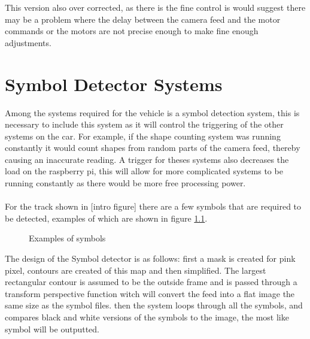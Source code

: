 This version also over corrected, as there is the fine control is would suggest there may be a problem where the delay between the camera feed and the motor commands or the motors are not precise enough to make fine enough adjustments. 

		\chapter{Symbol Detector Systems}
Among the systems required for the vehicle is a symbol detection system, this is necessary to include this system as it will control the triggering of the other systems on the car. For example, if the shape counting system was running constantly it would count shapes from random parts of the camera feed, thereby causing an inaccurate reading. A trigger for theses systems also decreases the load on the raspberry pi, this will allow for more complicated systems to be running constantly as there would be more free processing power.\\ \\
For the track shown in [intro figure] there are a few symbols that are required to be detected, examples of which are shown in figure \ref{fig:symbol_example}.

\begin{figure}[h]%
    \centering
    \qquad
    \caption{Examples of symbols}%
    \label{fig:symbol_example}%
\end{figure}

The design of the Symbol detector is as follows: first a mask is created for pink pixel, contours are created of this map and then simplified. The largest rectangular contour is assumed to be the outside frame and is passed through a transform perspective function witch will convert the feed into a flat image the same size as the symbol files. then the system loops through all the symbols, and compares black and white versions of the symbols to the image, the most like symbol will be outputted.     

